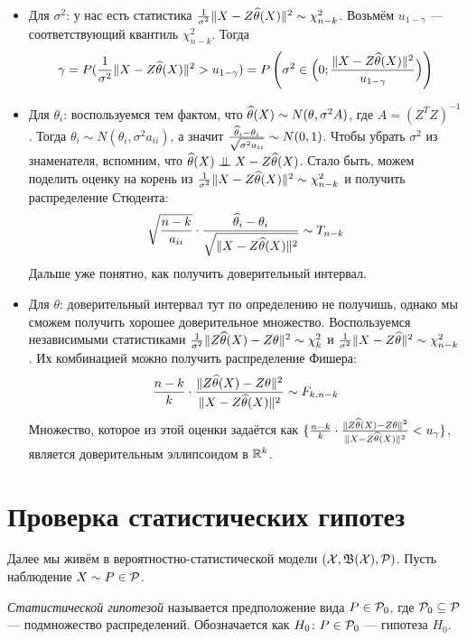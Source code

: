 \begin{itemize}
	\item Для $\sigma^2$: у нас есть статистика $\frac{1}{\sigma^2}\|X - Z\widehat{\theta}(X)\|^2 \sim \chi_{n - k}^2$. Возьмём $u_{1 - \gamma}$ --- соответствующий квантиль $\chi_{n - k}^2$. Тогда
	\[
		\gamma = P(\frac{1}{\sigma^2}\|X - Z\widehat{\theta}(X)\|^2 > u_{1 - \gamma}) = P\left(\sigma^2 \in \Big(0; \frac{\|X - Z\widehat{\theta}(X)\|^2}{u_{1 - \gamma}}\Big)\right)
	\]
	
	\item Для $\theta_i$: воспользуемся тем фактом, что $\widehat{\theta}(X) \sim N(\theta, \sigma^2A)$, где $A = (Z^TZ)^{-1}$. Тогда $\theta_i \sim N(\theta_i, \sigma^2a_{ii})$, а значит $\frac{\widehat{\theta}_i - \theta_i}{\sqrt{\sigma^2a_{ii}}} \sim N(0, 1)$. Чтобы убрать $\sigma^2$ из знаменателя, вспомним, что $\widehat{\theta}(X) \perp\mkern-9.5mu\perp X - Z\widehat{\theta}(X)$. Стало быть, можем поделить оценку на корень из $\frac{1}{\sigma^2}\|X - Z\widehat{\theta}(X)\|^2 \sim \chi_{n - k}^2$ и получить распределение Стюдента:
	\[
		\sqrt{\frac{n - k}{a_{ii}}} \cdot \frac{\widehat{\theta}_i - \theta_i}{\sqrt{\|X - Z\widehat{\theta}(X)\|^2}} \sim T_{n - k}
	\]
	Дальше уже понятно, как получить доверительный интервал.
	
	\item Для $\theta$: доверительный интервал тут по определению не получишь, однако мы сможем получить хорошее доверительное множество. Воспользуемся независимыми статистиками $\frac{1}{\sigma^2}\|Z\widehat{\theta}(X) - Z\theta\|^2 \sim \chi_k^2$ и $\frac{1}{\sigma^2}\|X - Z\widehat{\theta}\|^2 \sim \chi_{n - k}^2$. Их комбинацией можно получить распределение Фишера:
	\[
		\frac{n - k}{k} \cdot \frac{\|Z\widehat{\theta}(X) - Z\theta\|^2}{\|X - Z\widehat{\theta}(X)\|^2} \sim F_{k, n - k}
	\]
	Множество, которое из этой оценки задаётся как $\{\frac{n - k}{k} \cdot \frac{\|Z\widehat{\theta}(X) - Z\theta\|^2}{\|X - Z\widehat{\theta}(X)\|^2} < u_\gamma\}$, является доверительным эллипсоидом в $\mathbb{R}^k$.
\end{itemize}

\section{Проверка статистических гипотез}

\begin{note}
	Далее мы живём в вероятностно-статистической модели $(\mathcal{X}, \mathfrak{B}(\mathcal{X}), \mathcal{P})$. Пусть наблюдение $X \sim P \in \mathcal{P}$.
\end{note}

\begin{definition}
	\textit{Статистической гипотезой} называется предположение вида $P \in \mathcal{P}_0$, где $\mathcal{P}_0 \subseteq \mathcal{P}$ --- подмножество распределений. Обозначается как $H_0 \colon P \in \mathcal{P}_0$ --- гипотеза $H_0$.
\end{definition}


